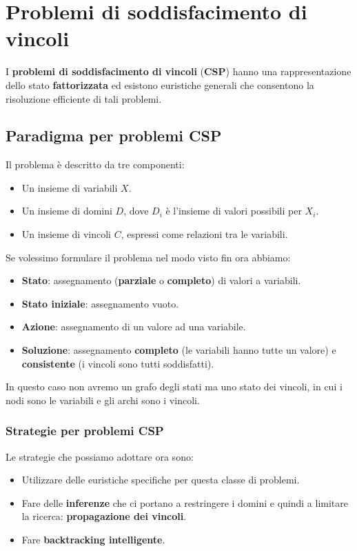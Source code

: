 \chapter{Problemi di soddisfacimento di vincoli}
I \textbf{problemi di soddisfacimento di vincoli} (\textbf{CSP}) hanno una rappresentazione dello stato
\textbf{fattorizzata} ed esistono euristiche generali che consentono la risoluzione efficiente di tali problemi.

\section{Paradigma per problemi CSP}
Il problema \`e descritto da tre componenti:
\begin{itemize}
	\item Un insieme di variabili $X$.
	\item Un insieme di domini $D$, dove $D_i$ \`e l'insieme di valori possibili per $X_i$.
	\item Un insieme di vincoli $C$, espressi come relazioni tra le variabili.
\end{itemize}
Se volessimo formulare il problema nel modo visto fin ora abbiamo:
\begin{itemize}
	\item \textbf{Stato}: assegnamento (\textbf{parziale} o \textbf{completo}) di valori a variabili.
	\item \textbf{Stato iniziale}: assegnamento vuoto.
	\item \textbf{Azione}: assegnamento di un valore ad una variabile.
	\item \textbf{Soluzione}: assegnamento \textbf{completo} (le variabili hanno tutte un valore) e
	      \textbf{consistente} (i vincoli sono tutti soddisfatti).
\end{itemize}
In questo caso non avremo un grafo degli stati ma uno stato dei vincoli, in cui i nodi sono le variabili
e gli archi sono i vincoli.

\subsection{Strategie per problemi CSP}
Le strategie che possiamo adottare ora sono:
\begin{itemize}
	\item Utilizzare delle euristiche specifiche per questa classe di problemi.
	\item Fare delle \textbf{inferenze} che ci portano a restringere i domini e quindi a limitare la ricerca:
	      \textbf{propagazione dei vincoli}.
	\item Fare \textbf{backtracking intelligente}.
\end{itemize}

